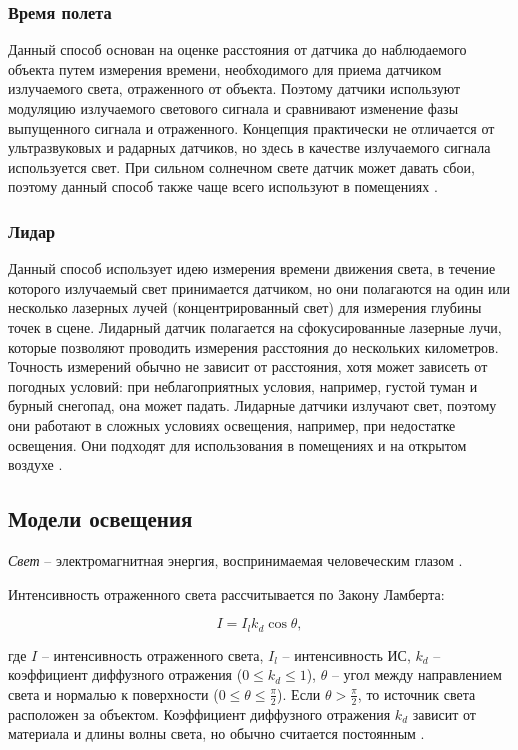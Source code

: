 \subsubsection*{Время полета}

Данный способ основан на оценке расстояния от датчика до наблюдаемого объекта путем измерения времени, необходимого для приема датчиком излучаемого света, отраженного от объекта. Поэтому датчики используют модуляцию излучаемого светового сигнала и сравнивают изменение фазы выпущенного сигнала и отраженного. Концепция практически не отличается от ультразвуковых и радарных датчиков, но здесь в качестве излучаемого сигнала используется свет. При сильном солнечном свете датчик может давать сбои, поэтому данный способ также чаще всего используют в помещениях \cite{rgbd}.

\subsubsection*{Лидар}

Данный способ использует идею измерения времени движения света, в течение которого излучаемый свет принимается датчиком, но они полагаются на один или несколько лазерных лучей (концентрированный свет) для измерения глубины точек в сцене. Лидарный датчик полагается на сфокусированные лазерные лучи, которые позволяют проводить измерения расстояния до нескольких километров. Точность измерений обычно не зависит от расстояния, хотя может зависеть от погодных условий: при неблагоприятных условия, например, густой туман и бурный снегопад, она может падать. Лидарные датчики излучают свет, поэтому они работают в сложных условиях освещения, например, при недостатке освещения. Они подходят для использования в помещениях и на открытом воздухе \cite{rgbd}.

\subsection{Модели освещения}

\textit{Свет} -- электромагнитная энергия, воспринимаемая человеческим глазом \cite{big_rus_enc}.

Интенсивность отраженного света рассчитывается по Закону Ламберта:

\begin{equation}
	I = I_l k_d \cos \theta,
\end{equation}

где $I$ -- интенсивность отраженного света, $I_l$ -- интенсивность ИС, $k_d$ -- коэффициент диффузного отражения ($0 \leq k_d \leq 1$), $\theta$ -- угол между направлением света и нормалью к поверхности ($0 \leq \theta \leq \frac{\pi}{2}$). Если $\theta > \frac{\pi}{2}$, то источник света расположен за объектом. Коэффициент диффузного отражения $k_d$ зависит от материала и длины волны света, но обычно считается постоянным \cite{rogers}.

